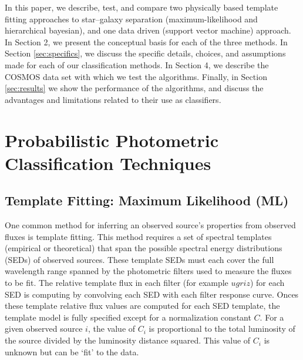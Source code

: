 \documentclass[12pt,preprint]{aastex}
\begin{document}
In this paper, we describe, test, and compare two physically based
template fitting approaches to star--galaxy separation
(maximum-likelihood and hierarchical bayesian), and one data driven
(support vector machine) approach.  In Section 2, we present the
conceptual basis for each of the three methods.  In Section
\ref{sec:specifics}, we discuss the specific details, choices, and
assumptions made for each of our classification methods.  In Section
4, we describe the COSMOS data set with which we test the algorithms.
Finally, in Section \ref{sec:results} we show the performance of the
algorithms, and discuss the advantages and limitations related to
their use as classifiers.


%
%
\section{Probabilistic Photometric Classification Techniques}

\subsection{Template Fitting: Maximum Likelihood (ML)}
\label{ssec:MLmethod}

One common method for inferring an observed source's properties from
observed fluxes is template fitting.  This method requires a set of
spectral templates (empirical or theoretical) that span the possible
spectral energy distributions (SEDs) of observed sources.  These
template SEDs must each cover the full wavelength range spanned by the
photometric filters used to measure the fluxes to be fit.  The
relative template flux in each filter (for example $ugriz$) for each
SED is computing by convolving each SED with each filter response
curve.  Onces these template relative flux values are computed for
each SED template, the template model is fully specified except for a
normalization constant $C$.  For a given observed source $i$, the
value of $C_i$ is proportional to the total luminosity of the source
divided by the luminosity distance squared.  This value of $C_i$ is
unknown but can be `fit' to the data.

  
\end{document}
